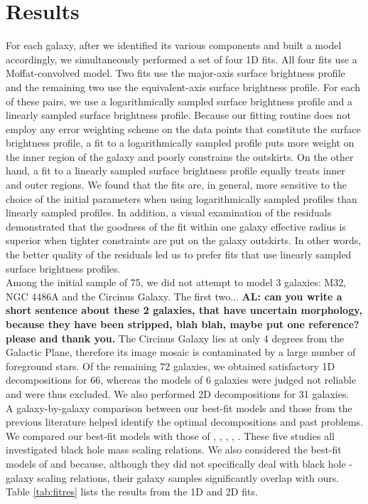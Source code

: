 \documentclass[preprint2]{emulateapj}
\begin{document}
\section{Results}
\label{sec:res}
For each galaxy, after we identified its various components and built a model accordingly, 
we simultaneously performed a set of four 1D fits.
All four fits use a Moffat-convolved model.
Two fits use the major-axis surface brightness profile and the remaining two use the equivalent-axis surface brightness profile. 
For each of these pairs, we use a logarithmically sampled surface brightness profile 
and a linearly sampled surface brightness profile. 
Because our fitting routine does not employ any error weighting scheme on the data points that constitute the surface brightness profile, 
a fit to a logarithmically sampled profile puts more weight on the inner region of the galaxy 
and poorly constrains the outskirts.
On the other hand, a fit to a linearly sampled surface brightness profile equally treats inner and outer regions. 
We found that the fits are, in general, more sensitive to the choice of the initial parameters 
when using logarithmically sampled profiles than linearly sampled profiles. 
In addition, a visual examination of the residuals demonstrated that the goodness of the fit within one galaxy effective radius 
is superior when tighter constraints are put on the galaxy outskirts.
In other words, the better quality of the residuals led us to prefer fits that use linearly sampled surface brightness profiles. \\
Among the initial sample of 75, we did not attempt to model 3 galaxies: M32, NGC 4486A and the Circinus Galaxy. 
The first two... {\bf AL: can you write a short sentence about these 2 galaxies, that have uncertain morphology,
because they have been stripped, blah blah, maybe put one reference? please and thank you.}
The Circinus Galaxy lies at only 4 degrees from the Galactic Plane, 
therefore its image mosaic is contaminated by a large number of foreground stars.
Of the remaining 72 galaxies, 
we obtained satisfactory 1D decompositions for 66, 
whereas the models of 6 galaxies were judged not reliable and were thus excluded. 
We also performed 2D decompositions for 31 galaxies. \\
A galaxy-by-galaxy comparison between our best-fit models and those from the previous literature 
helped identify the optimal decompositions and past problems. 
We compared our best-fit models with those of \cite{grahamdriver2007}, \cite{sani2011}, \cite{beifiori2012}, 
\cite{vika2012}, \cite{lasker2014data}. 
These five studies all investigated black hole mass scaling relations.
We also considered the best-fit models of \cite{laurikainen2010} and \cite{rusli2013} because,   
although they did not specifically deal with black hole - galaxy scaling relations, 
their galaxy samples significantly overlap with ours. \\
Table \ref{tab:fitres} lists the results from the 1D and 2D fits.
\end{document}
